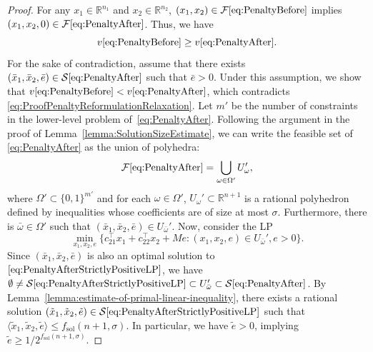 \documentclass[runningheads,orivec]{llncs}
\newcommand{\MacroColor}[1]{#1}
\newcommand{\SizeThree}[3]{\langle#1,#2,#3\rangle}
\newcommand{\NVariables}{\MacroColor{n}}
\newcommand{\NConstraints}{\MacroColor{m}}
\newcommand{\OptValFunc}{\MacroColor{v}}
\newcommand{\OptSolSet}{\MacroColor{\mathcal{S}}}
\newcommand{\FeasSolSet}{\MacroColor{\mathcal{F}}}
\newcommand{\SolutionSizeEstimate}{\MacroColor{f_{\mathrm{sol}}}}
\newcommand{\ReformPen}{\MacroColor{e}}
\newcommand{\EncodingSize}{size}
\begin{document}
\begin{appendix}
\begin{proof}
For any $x_1 \in \mathbb{R}^{\NVariables_1}$ and $x_2 \in \mathbb{R}^{\NVariables_2}$, $(x_1, x_2) \in \FeasSolSet\eqref{eq:PenaltyBefore}$ implies $(x_1, x_2, 0) \in \FeasSolSet\eqref{eq:PenaltyAfter}$.
Thus, we have 
\begin{equation}
\OptValFunc\eqref{eq:PenaltyBefore} \ge \OptValFunc\eqref{eq:PenaltyAfter}.
\label{eq:ProofPenaltyReformulationRelaxation}
\end{equation}
For the sake of contradiction, assume that there exists $(\bar{x}_1, \bar{x}_2, \bar{\ReformPen}) \in \OptSolSet\eqref{eq:PenaltyAfter}$ such that $\bar{\ReformPen} > 0$.
Under this assumption, we show that $\OptValFunc\eqref{eq:PenaltyBefore} < \OptValFunc\eqref{eq:PenaltyAfter}$, which contradicts \eqref{eq:ProofPenaltyReformulationRelaxation}.
Let $\NConstraints'$ be the number of constraints in the lower-level problem of~\eqref{eq:PenaltyAfter}.
Following the argument in the proof of Lemma~\ref{lemma:SolutionSizeEstimate}, we can write the feasible set of \eqref{eq:PenaltyAfter} as the union of polyhedra:
$$
\FeasSolSet\eqref{eq:PenaltyAfter} = \bigcup_{\omega \in \Omega'} U_{\omega}',
$$
where $\Omega' \subset \{0, 1\}^{\NConstraints'}$ and for each $\omega \in \Omega'$, $U_{\omega}' \subset \mathbb{R}^{\NVariables + 1}$ is a rational polyhedron defined by inequalities whose coefficients are of \EncodingSize{} at most $\sigma$.
Furthermore, there is $\bar{\omega} \in \Omega'$ such that $(\bar{x}_1, \bar{x}_2, \bar{\ReformPen}) \in U_{\bar{\omega}}'$.
Now, consider the LP
\begin{equation}
\min_{x_1, x_2, \ReformPen} \{ c_{2 1}^{\top} x_1 + c_{2 2}^{\top} x_2 + M \ReformPen : (x_1, x_2, \ReformPen) \in U_{\bar{\omega}}', \ReformPen > 0 \}.
\label{eq:PenaltyAfterStrictlyPositiveLP}
\end{equation}
Since $(\bar{x}_1, \bar{x}_2, \bar{\ReformPen})$ is also an optimal solution to $\eqref{eq:PenaltyAfterStrictlyPositiveLP}$, we have $\emptyset \not= \OptSolSet\eqref{eq:PenaltyAfterStrictlyPositiveLP} \subset U_{\bar{\omega}}' \subset \OptSolSet\eqref{eq:PenaltyAfter}$.
By Lemma~\ref{lemma:estimate-of-primal-linear-inequality}, there exists a rational solution $(\tilde{x}_1, \tilde{x}_2, \tilde{\ReformPen}) \in \OptSolSet\eqref{eq:PenaltyAfterStrictlyPositiveLP}$ such that $\SizeThree{\tilde{x}_1}{\tilde{x}_2}{\tilde{\ReformPen}} \le \SolutionSizeEstimate(\NVariables + 1, \sigma)$.
In particular, we have $\tilde{\ReformPen} > 0$, implying $\tilde{\ReformPen} \ge 1 / 2^{\SolutionSizeEstimate(\NVariables + 1, \sigma)}$.

\end{proof}
\end{appendix}
\end{document}
